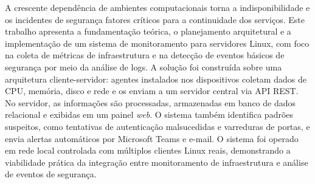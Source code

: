 \documentclass[
    12pt
    ,oneside
    ,a4paper
    ,chapter=TITLE
    ,section=TITLE
    ,sumario=abnt-6027-2012]{abntex2}
\begin{document}

\imprimircapa
\imprimirfolhaderosto

\begin{resumo}
    A crescente dependência de ambientes computacionais torna a indisponibilidade e os incidentes de segurança fatores críticos para a continuidade dos serviços. Este trabalho apresenta a fundamentação teórica, o planejamento arquitetural e a implementação de um sistema de monitoramento para servidores Linux, com foco na coleta de métricas de infraestrutura e na detecção de eventos básicos de segurança por meio da análise de logs. A solução foi construída sobre uma arquitetura cliente-servidor: agentes instalados nos dispositivos coletam dados de CPU, memória, disco e rede e os enviam a um servidor central via API REST. No servidor, as informações são processadas, armazenadas em banco de dados relacional e exibidas em um painel \textit{web}. O sistema também identifica padrões suspeitos,  como tentativas de autenticação malsucedidas e varreduras de portas, e envia alertas automáticos por Microsoft Teams e e-mail. O sistema foi operado em rede local controlada com múltiplos clientes Linux reais, demonstrando a viabilidade prática da integração entre monitoramento de infraestrutura e análise de eventos de segurança.

\end{resumo}

\listadefiguras
\listadecodigos
\end{document}
